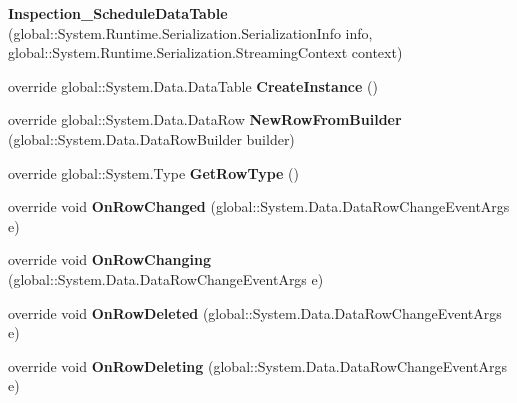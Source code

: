 \begin{DoxyCompactItemize}
\item 
\mbox{\label{class_a_f_h___scheduler_1_1_home_inspection_db_data_set_1_1_inspection___schedule_data_table_a960dca53b321a8e03ec79c35f6fa4e23}} 
{\bfseries Inspection\+\_\+\+Schedule\+Data\+Table} (global\+::\+System.\+Runtime.\+Serialization.\+Serialization\+Info info, global\+::\+System.\+Runtime.\+Serialization.\+Streaming\+Context context)
\item 
\mbox{\label{class_a_f_h___scheduler_1_1_home_inspection_db_data_set_1_1_inspection___schedule_data_table_a324086d0a69929c7ff3e5bc2cc097342}} 
override global\+::\+System.\+Data.\+Data\+Table {\bfseries Create\+Instance} ()
\item 
\mbox{\label{class_a_f_h___scheduler_1_1_home_inspection_db_data_set_1_1_inspection___schedule_data_table_a19a0b98aac733019f644f1ed17f15bed}} 
override global\+::\+System.\+Data.\+Data\+Row {\bfseries New\+Row\+From\+Builder} (global\+::\+System.\+Data.\+Data\+Row\+Builder builder)
\item 
\mbox{\label{class_a_f_h___scheduler_1_1_home_inspection_db_data_set_1_1_inspection___schedule_data_table_a2f67d7c98c7f59f20ac807e1fc64c14c}} 
override global\+::\+System.\+Type {\bfseries Get\+Row\+Type} ()
\item 
\mbox{\label{class_a_f_h___scheduler_1_1_home_inspection_db_data_set_1_1_inspection___schedule_data_table_a8eb40fe6b00ffa94dcf33c5ccf669672}} 
override void {\bfseries On\+Row\+Changed} (global\+::\+System.\+Data.\+Data\+Row\+Change\+Event\+Args e)
\item 
\mbox{\label{class_a_f_h___scheduler_1_1_home_inspection_db_data_set_1_1_inspection___schedule_data_table_ab5ce6e47682ebf57b6be1c6f720730f9}} 
override void {\bfseries On\+Row\+Changing} (global\+::\+System.\+Data.\+Data\+Row\+Change\+Event\+Args e)
\item 
\mbox{\label{class_a_f_h___scheduler_1_1_home_inspection_db_data_set_1_1_inspection___schedule_data_table_a5d03b7092464df788345345df4aca0e2}} 
override void {\bfseries On\+Row\+Deleted} (global\+::\+System.\+Data.\+Data\+Row\+Change\+Event\+Args e)
\item 
\mbox{\label{class_a_f_h___scheduler_1_1_home_inspection_db_data_set_1_1_inspection___schedule_data_table_a49faacc17d91c711bf69729dd2131de5}} 
override void {\bfseries On\+Row\+Deleting} (global\+::\+System.\+Data.\+Data\+Row\+Change\+Event\+Args e)
\end{DoxyCompactItemize}
